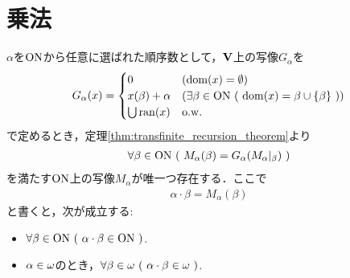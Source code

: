 \section{乗法}
	\begin{screen}
		\begin{thm}[順序数の乗法]
		\label{thm:the_definition_of_multiplication_of_ordinal_numbers}
			$\alpha$を$\mathrm{ON}$から任意に選ばれた順序数として，$\mathbf{V}$上の写像$G_\alpha$を
			\begin{align}
				G_\alpha(x) = 
				\begin{cases}
					0 & (\operatorname{dom}(x) = \emptyset) \\
					x(\beta) + \alpha & (
					\exists \beta \in \mathrm{ON}\ (\ \operatorname{dom}(x) = \beta \cup \{\beta\}\ )) \\
					\bigcup \operatorname{ran}(x) & \mathrm{o.w.}
				\end{cases}
			\end{align}
			で定めるとき，定理\ref{thm:transfinite_recursion_theorem}より
			\begin{align}
				\forall \beta \in \mathrm{ON}\ (\ M_\alpha(\beta) = G_\alpha(M_\alpha|_\beta)\ )
			\end{align}
			を満たす$\mathrm{ON}$上の写像$M_\alpha$が唯一つ存在する．ここで
			\begin{align}
				\alpha \cdot \beta = M_\alpha (\beta)
			\end{align}
			と書くと，次が成立する:
			\begin{itemize}
				\item $\forall \beta \in \mathrm{ON}\ (\ \alpha \cdot \beta \in \mathrm{ON}\ )$.
				\item $\alpha \in {\bf \omega}$のとき，$\forall \beta \in {\bf \omega}\ 
				(\ \alpha \cdot \beta \in {\bf \omega}\ )$.
			\end{itemize}
		\end{thm}
	\end{screen}